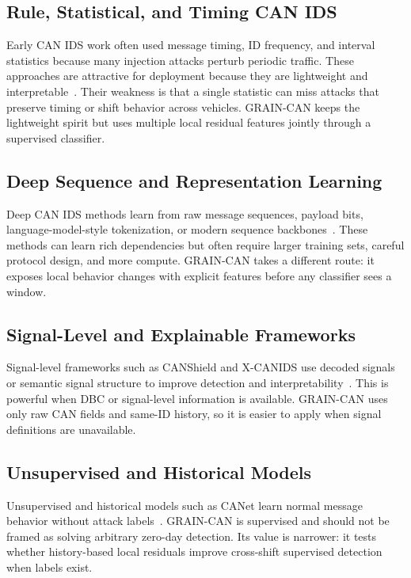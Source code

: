 \documentclass[runningheads]{llncs}
\begin{document}
\subsection{Rule, Statistical, and Timing CAN IDS}
Early CAN IDS work often used message timing, ID frequency, and interval statistics because many injection attacks perturb periodic traffic. These approaches are attractive for deployment because they are lightweight and interpretable~\cite{song2016intrusion,taylor2016frequency,blevins2021time}. Their weakness is that a single statistic can miss attacks that preserve timing or shift behavior across vehicles. GRAIN-CAN keeps the lightweight spirit but uses multiple local residual features jointly through a supervised classifier.

\subsection{Deep Sequence and Representation Learning}
Deep CAN IDS methods learn from raw message sequences, payload bits, language-model-style tokenization, or modern sequence backbones~\cite{alkhatib2022canbert,liu2026mids}. These methods can learn rich dependencies but often require larger training sets, careful protocol design, and more compute. GRAIN-CAN takes a different route: it exposes local behavior changes with explicit features before any classifier sees a window.

\subsection{Signal-Level and Explainable Frameworks}
Signal-level frameworks such as CANShield and X-CANIDS use decoded signals or semantic signal structure to improve detection and interpretability~\cite{shahriar2022canshield,xcanids2023}. This is powerful when DBC or signal-level information is available. GRAIN-CAN uses only raw CAN fields and same-ID history, so it is easier to apply when signal definitions are unavailable.

\subsection{Unsupervised and Historical Models}
Unsupervised and historical models such as CANet learn normal message behavior without attack labels~\cite{canet2019}. GRAIN-CAN is supervised and should not be framed as solving arbitrary zero-day detection. Its value is narrower: it tests whether history-based local residuals improve cross-shift supervised detection when labels exist.
\end{document}
